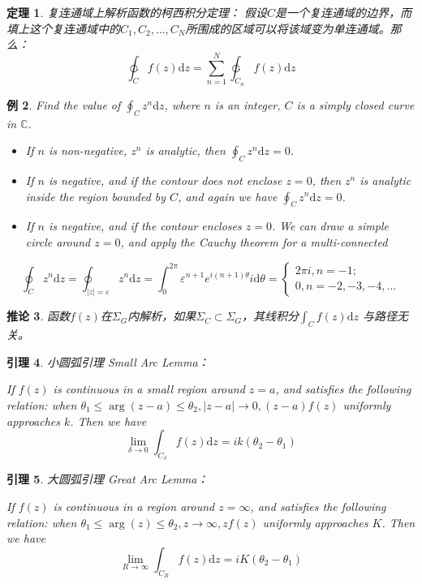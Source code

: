 \documentclass[10pt, a4paper, oneside]{ctexbook}
\newtheorem{theorem}{定理}[section]
\newtheorem{lemma}[theorem]{引理}
\newtheorem{corollary}[theorem]{推论}
\newtheorem{example}[theorem]{例}
\def\D{\mathrm{d}}
\newcommand{\F}[1][z]
{\ensuremath{f(#1)}}
\begin{document}
\begin{theorem}
    \label{cit2}
    复连通域上解析函数的柯西积分定理：
    假设$C$是一个复连通域的边界，而填上这个复连通域中的$C_1,C_2,\dots,C_N$所围成的区域可以将该域变为单连通域。那么：
    $$ \ointctrclockwise_C \F \D z= \sum_{n=1}^N \ointctrclockwise_{C_n} \F \D z$$
\end{theorem}
\begin{example}
Find the value of $\displaystyle \oint_{C} z^{n} \D z$, where $n$ is an integer, $C$ is a simply closed curve in $\mathbb{C}$.
\begin{itemize} \rm
\item  If $n$ is non-negative, $z^{n}$ is analytic, then $\displaystyle \oint_{C} z^{n} \D z=0$.
\item  If $n$ is negative, and if the contour does not enclose $z=0$, then $z^{n}$ is analytic inside the region bounded by $C$, and again we have $\displaystyle \oint_{C} z^{n} \D z=0$.
\item  If $n$ is negative, and if the contour encloses $z=0$. We can draw a simple circle around $z=0$, and apply the Cauchy theorem for a multi-connected 
\end{itemize}
\begin{equation*}
\oint_{C} z^{n} \D z=\oint_{|z|=\varepsilon} z^{n} \D z=\int_{0}^{2 \pi} \varepsilon^{n+1} e^{i(n+1) \theta} i \D \theta=\left\{\begin{array}{l}
2 \pi i, n=-1 ; \\
0, n=-2,-3,-4, \ldots
\end{array}\right.
\end{equation*}
\end{example}
\begin{corollary}
    函数$f(z)$在$\Sigma_G$内解析，如果$\Sigma_C\subset \Sigma_G$，其线积分$\displaystyle \int_C f(z)\D z$ 与路径无关。
\end{corollary}

\newpage

\begin{lemma}
    {\rm 小圆弧引理} Small Arc Lemma：

    {\rm If $f(z)$ is continuous in a small region around $z=a$, and satisfies the following relation: when $\theta_{1} \leq \arg (z-a) \leq \theta_{2},|z-a| \rightarrow 0,(z-a) f(z)$ uniformly approaches $k$. Then we have}
    $$\lim _{\delta \rightarrow 0} \int_{C_{\delta}} f(z) \D z=i k\left(\theta_{2}-\theta_{1}\right)$$
\end{lemma}

\begin{lemma}
    {\rm 大圆弧引理} Great Arc Lemma：

    {\rm If $f(z)$ is continuous in a region around $z=\infty$, and satisfies the following relation: when $\theta_{1} \leq \arg (z) \leq \theta_{2}, z \rightarrow \infty, z f(z)$ uniformly approaches $K$. Then we have}
    \begin{equation*}
    \lim _{R \rightarrow \infty} \int_{C_{R}} f(z) \D z=i K\left(\theta_{2}-\theta_{1}\right)
    \end{equation*}
\end{lemma}
\end{document}
